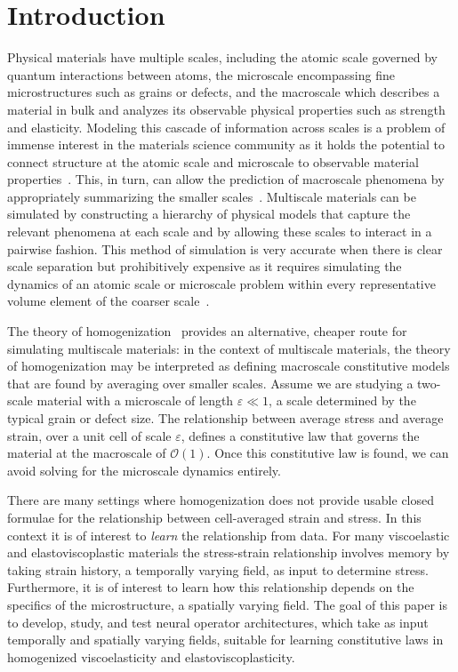 \documentclass[letterpaper,11pt]{article}
\begin{document}
\section{Introduction}
\label{sec:I}
Physical materials have multiple scales, including the atomic scale governed by quantum interactions between atoms, the microscale encompassing fine microstructures such as grains or defects, and the macroscale which describes a material in bulk and analyzes its observable physical properties such as strength and elasticity. Modeling this cascade of information across scales is a problem of immense interest in the materials science community as it holds the potential to connect structure at the atomic scale and microscale to observable material properties~\cite{phillips2001crystals}. This, in turn, can allow the prediction of macroscale phenomena by appropriately summarizing the smaller scales~\cite{zohdi2008introduction}. Multiscale materials can be simulated by constructing a hierarchy of physical models that capture the relevant phenomena at each scale and by allowing these scales to interact in a pairwise fashion. This method of simulation is very accurate when there is clear scale separation but prohibitively expensive as it requires simulating the dynamics of an atomic scale or microscale problem within every representative volume element of the coarser scale~\cite{zohdi2008introduction}.

The theory of homogenization~\cite{bensoussan2011asymptotic,pavliotis2008multiscale} provides an alternative, cheaper route for simulating multiscale materials: in the context of multiscale materials, the theory of homogenization may be interpreted as defining macroscale constitutive models that are found by averaging over smaller scales.  Assume we are studying a two-scale material with a microscale of length $\varepsilon \ll 1$, a scale determined by the typical grain or defect size. The relationship between average stress
and average strain, over a unit cell of scale $\varepsilon$, defines a constitutive law that governs the material at the
macroscale of $\mathcal{O}(1).$ Once this constitutive law is found, we can avoid solving for the microscale dynamics entirely. 

There are many settings where homogenization does not provide usable closed formulae for the relationship
between cell-averaged strain and stress. In this context it is of interest to \emph{learn} the relationship from data.
For many viscoelastic and elastoviscoplastic materials the stress-strain relationship involves memory by taking strain history, a temporally varying field, as input to determine stress. 
Furthermore, it is of interest to learn how this relationship depends on the specifics of the microstructure, a spatially varying field.  The goal of this paper is to develop, study, and test neural operator architectures, which take as input temporally and spatially varying fields, suitable for learning constitutive laws in homogenized viscoelasticity and elastoviscoplasticity.
\end{document}

